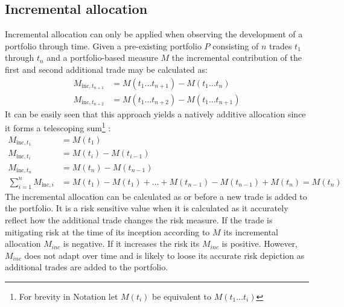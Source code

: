 \documentclass[../Thesis_AHoecherl.tex]{subfiles}
\begin{document}


\subsection{Incremental allocation\label{sec:Incremental alloaction}}
Incremental allocation can only be applied when observing the development of a portfolio through time. Given a pre-existing portfolio $P$ consisting of $n$ trades $t_1$ through $t_n$ and a portfolio-based measure $M$ the incremental contribution of the first and second additional trade may be calculated as:
\begin{align*}
M_{\text{inc},t_{n+1}} & =M\left(t_1\dots t_{n+1}\right)- M\left(t_1\dots t_{n}\right) \\
M_{\text{inc},t_{n+2}} & =M\left(t_1\dots t_{n+2}\right)- M\left(t_1\dots t_{n+1}\right)
\end{align*}
It can be easily seen that this approach yields a natively additive allocation since it forms a telescoping sum\footnote{For brevity in Notation let $M(t_i)$ be equivalent to $M(t_1\dots t_i)$ 
} :
\begin{align*}
M_{\text{inc},t_1}&=M(t_1) \\
M_{\text{inc},t_i}&= M(t_i)-M(t_{i-1}) \\
M_{\text{inc},t_n}&= M(t_n) - M(t_{n-1})\\
\sum_{i=1}^{n}{M_{\text{inc},i}} &= M(t_1)-M(t_1)+\dots+M(t_{n-1})-M(t_{n-1})+M(t_n) = M(t_n)
\end{align*}
The incremental allocation can be calculated as or before a new trade is added to the portfolio. It is a risk sensitive value when it is calculated as it accurately reflect how the additional trade changes the risk measure. 
If the trade is mitigating risk at the time of its inception according to $M$ its incremental allocation $M_{inc}$ is negative. If it increases the risk its $M_{inc}$ is positive. However, $M_{inc}$ does not adapt over time and is likely to loose its accurate risk depiction as additional trades are added to the portfolio. 
\end{document}
